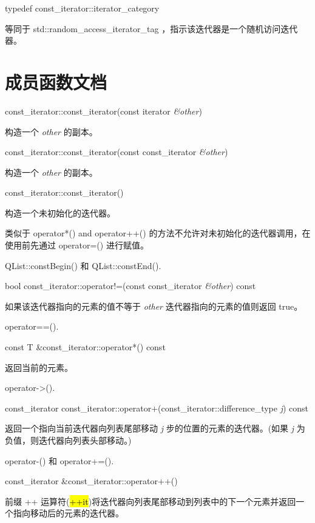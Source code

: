 typedef const\_iterator::iterator\_category

等同于 std::random\_access\_iterator\_tag ，指示该迭代器是一个随机访问迭代器。

\section{成员函数文档}


const\_iterator::const\_iterator(const iterator \emph{\&other})

构造一个 \emph{other} 的副本。

const\_iterator::const\_iterator(const const\_iterator \emph{\&other})

构造一个 \emph{other} 的副本。

const\_iterator::const\_iterator()

构造一个未初始化的迭代器。

类似于 operator*() and operator++() 的方法不允许对未初始化的迭代器调用，在使用前先通过 operator=() 进行赋值。

\begin{notice}[另请参见]
QList::constBegin() 和 QList::constEnd().
\end{notice}


bool const\_iterator::operator!=(const const\_iterator  \emph{\&other}) const

如果该迭代器指向的元素的值不等于 \emph{other} 迭代器指向的元素的值则返回 true。


\begin{notice}[另请参见]
operator==().
\end{notice}


const T \&const\_iterator::operator*() const

返回当前的元素。

\begin{notice}[另请参见]
operator->().
\end{notice}


const\_iterator const\_iterator::operator+(const\_iterator::difference\_type \emph{j}) const

返回一个指向当前迭代器向列表尾部移动 \emph{j} 步的位置的元素的迭代器。(如果 \emph{j} 为负值，则迭代器向列表头部移动。)


\begin{notice}[另请参见]
operator-() 和 operator+=().
\end{notice}


const\_iterator \&const\_iterator::operator++()

前缀 ++ 运算符(\hl{++it})将迭代器向列表尾部移动到列表中的下一个元素并返回一个指向移动后的元素的迭代器。

